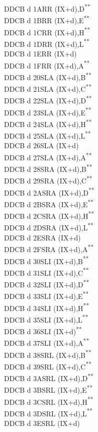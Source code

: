 \documentclass[12pt,twoside,openright,a4paper]{book}
\newcommand{\UNDOC}{\textnormal{\textsuperscript{**}}}
\begin{document}
\begin{multicols}{3}
{\begin{tabbing}
	DDCB d 1A\>RR (IX+d),D\UNDOC\\
	DDCB d 1B\>RR (IX+d),E\UNDOC\\
	DDCB d 1C\>RR (IX+d),H\UNDOC\\
	DDCB d 1D\>RR (IX+d),L\UNDOC\\
	DDCB d 1E\>RR (IX+d)\\
	DDCB d 1F\>RR (IX+d),A\UNDOC\\
	DDCB d 20\>SLA (IX+d),B\UNDOC\\
	DDCB d 21\>SLA (IX+d),C\UNDOC\\
	DDCB d 22\>SLA (IX+d),D\UNDOC\\
	DDCB d 23\>SLA (IX+d),E\UNDOC\\
	DDCB d 24\>SLA (IX+d),H\UNDOC\\
	DDCB d 25\>SLA (IX+d),L\UNDOC\\
	DDCB d 26\>SLA (IX+d)\\
	DDCB d 27\>SLA (IX+d),A\UNDOC\\
	DDCB d 28\>SRA (IX+d),B\UNDOC\\
	DDCB d 29\>SRA (IX+d),C\UNDOC\\
	DDCB d 2A\>SRA (IX+d),D\UNDOC\\
	DDCB d 2B\>SRA (IX+d),E\UNDOC\\
	DDCB d 2C\>SRA (IX+d),H\UNDOC\\
	DDCB d 2D\>SRA (IX+d),L\UNDOC\\
	DDCB d 2E\>SRA (IX+d)\\
	DDCB d 2F\>SRA (IX+d),A\UNDOC\\
	DDCB d 30\>SLI (IX+d),B\UNDOC\\
	DDCB d 31\>SLI (IX+d),C\UNDOC\\
	DDCB d 32\>SLI (IX+d),D\UNDOC\\
	DDCB d 33\>SLI (IX+d),E\UNDOC\\
	DDCB d 34\>SLI (IX+d),H\UNDOC\\
	DDCB d 35\>SLI (IX+d),L\UNDOC\\
	DDCB d 36\>SLI (IX+d)\UNDOC\\
	DDCB d 37\>SLI (IX+d),A\UNDOC\\
	DDCB d 38\>SRL (IX+d),B\UNDOC\\
	DDCB d 39\>SRL (IX+d),C\UNDOC\\
	DDCB d 3A\>SRL (IX+d),D\UNDOC\\
	DDCB d 3B\>SRL (IX+d),E\UNDOC\\
	DDCB d 3C\>SRL (IX+d),H\UNDOC\\
	DDCB d 3D\>SRL (IX+d),L\UNDOC\\
	DDCB d 3E\>SRL (IX+d)\\

\end{tabbing}}
\end{multicols}
\end{document}
